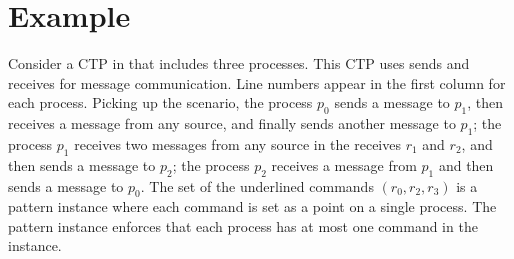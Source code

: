 \section{Example}
Consider a CTP in  that includes three processes. This CTP uses sends and receives for message communication. Line numbers appear in the first column for each process. Picking up the scenario, the process $p_0$ sends a message to $p_1$, then receives a message from any source, and finally sends another message to $p_1$; the process $p_1$ receives two messages from any source in the receives $r_1$ and $r_2$, and then sends a message to $p_2$; the process $p_2$ receives a message from $p_1$ and then sends a message to $p_0$. The set of the underlined commands $(r_0,r_2,r_3)$ is a pattern instance where each command is set as a point on a single process. The pattern instance enforces that each process has at most one command in the instance.